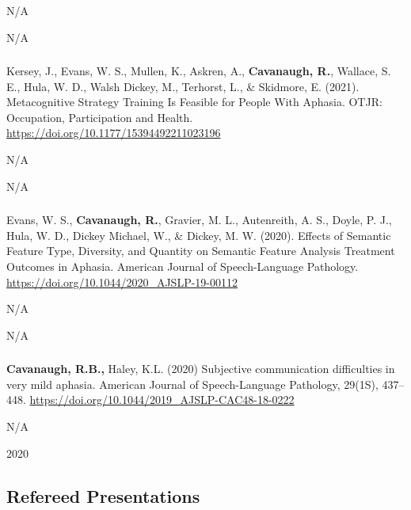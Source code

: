 \documentclass[
]{article}
\begin{document}
N/A

N/A

\hypertarget{section-5}{%
\subsubsection{}\label{section-5}}

Kersey, J., Evans, W. S., Mullen, K., Askren, A., \textbf{Cavanaugh,
R.}, Wallace, S. E., Hula, W. D., Walsh Dickey, M., Terhorst, L., \&
Skidmore, E. (2021). Metacognitive Strategy Training Is Feasible for
People With Aphasia. OTJR: Occupation, Participation and Health.
\url{https://doi.org/10.1177/15394492211023196}

N/A

N/A

\hypertarget{section-6}{%
\subsubsection{}\label{section-6}}

Evans, W. S., \textbf{Cavanaugh, R.}, Gravier, M. L., Autenreith, A. S.,
Doyle, P. J., Hula, W. D., Dickey Michael, W., \& Dickey, M. W. (2020).
Effects of Semantic Feature Type, Diversity, and Quantity on Semantic
Feature Analysis Treatment Outcomes in Aphasia. American Journal of
Speech-Language Pathology.
\url{https://doi.org/10.1044/2020_AJSLP-19-00112}

N/A

N/A

\hypertarget{section-7}{%
\subsubsection{}\label{section-7}}

\textbf{Cavanaugh, R.B.,} Haley, K.L. (2020) Subjective communication
difficulties in very mild aphasia. American Journal of Speech-Language
Pathology, 29(1S), 437--448.
\url{https://doi.org/10.1044/2019_AJSLP-CAC48-18-0222}

N/A

2020

\hypertarget{refereed-presentations}{%
\subsection{Refereed Presentations}\label{refereed-presentations}}

\hypertarget{section-8}{%
\subsubsection{}\label{section-8}}
\end{document}
